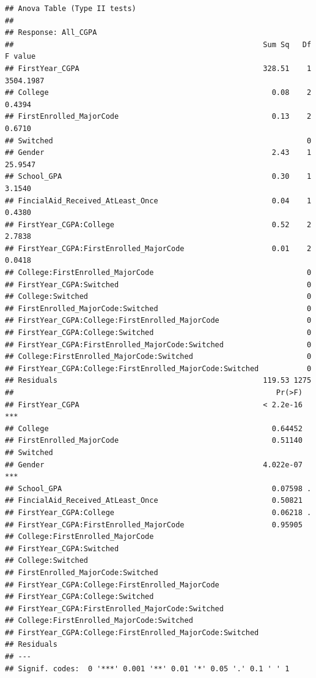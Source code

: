 \documentclass[
  12pt,
]{article}
\begin{document}
\begin{verbatim}
## Anova Table (Type II tests)
## 
## Response: All_CGPA
##                                                         Sum Sq   Df   F value
## FirstYear_CGPA                                          328.51    1 3504.1987
## College                                                   0.08    2    0.4394
## FirstEnrolled_MajorCode                                   0.13    2    0.6710
## Switched                                                          0          
## Gender                                                    2.43    1   25.9547
## School_GPA                                                0.30    1    3.1540
## FincialAid_Received_AtLeast_Once                          0.04    1    0.4380
## FirstYear_CGPA:College                                    0.52    2    2.7838
## FirstYear_CGPA:FirstEnrolled_MajorCode                    0.01    2    0.0418
## College:FirstEnrolled_MajorCode                                   0          
## FirstYear_CGPA:Switched                                           0          
## College:Switched                                                  0          
## FirstEnrolled_MajorCode:Switched                                  0          
## FirstYear_CGPA:College:FirstEnrolled_MajorCode                    0          
## FirstYear_CGPA:College:Switched                                   0          
## FirstYear_CGPA:FirstEnrolled_MajorCode:Switched                   0          
## College:FirstEnrolled_MajorCode:Switched                          0          
## FirstYear_CGPA:College:FirstEnrolled_MajorCode:Switched           0          
## Residuals                                               119.53 1275          
##                                                            Pr(>F)    
## FirstYear_CGPA                                          < 2.2e-16 ***
## College                                                   0.64452    
## FirstEnrolled_MajorCode                                   0.51140    
## Switched                                                             
## Gender                                                  4.022e-07 ***
## School_GPA                                                0.07598 .  
## FincialAid_Received_AtLeast_Once                          0.50821    
## FirstYear_CGPA:College                                    0.06218 .  
## FirstYear_CGPA:FirstEnrolled_MajorCode                    0.95905    
## College:FirstEnrolled_MajorCode                                      
## FirstYear_CGPA:Switched                                              
## College:Switched                                                     
## FirstEnrolled_MajorCode:Switched                                     
## FirstYear_CGPA:College:FirstEnrolled_MajorCode                       
## FirstYear_CGPA:College:Switched                                      
## FirstYear_CGPA:FirstEnrolled_MajorCode:Switched                      
## College:FirstEnrolled_MajorCode:Switched                             
## FirstYear_CGPA:College:FirstEnrolled_MajorCode:Switched              
## Residuals                                                            
## ---
## Signif. codes:  0 '***' 0.001 '**' 0.01 '*' 0.05 '.' 0.1 ' ' 1
\end{verbatim}
\end{document}
